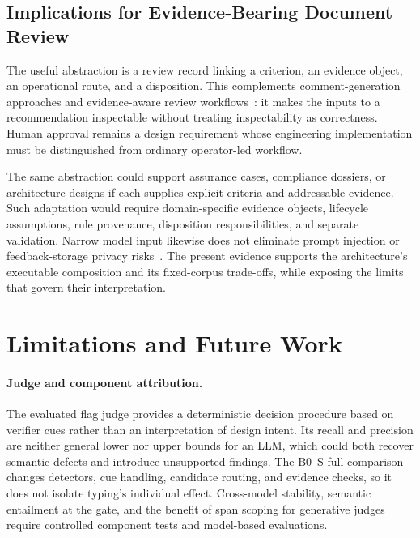 \documentclass[computers,article,submit,moreauthors]{Definitions/mdpi}
\begin{document}
\subsection{Implications for Evidence-Bearing Document Review}

The useful abstraction is a review record linking a criterion, an evidence object, an operational route, and a disposition. This complements comment-generation approaches and evidence-aware review workflows~\cite{alsawalqah2026,pornprasit2024}: it makes the inputs to a recommendation inspectable without treating inspectability as correctness. Human approval remains a design requirement whose engineering implementation must be distinguished from ordinary operator-led workflow.

The same abstraction could support assurance cases, compliance dossiers, or architecture designs if each supplies explicit criteria and addressable evidence. Such adaptation would require domain-specific evidence objects, lifecycle assumptions, rule provenance, disposition responsibilities, and separate validation. Narrow model input likewise does not eliminate prompt injection or feedback-storage privacy risks~\cite{shi2024inject,mempriv2025}. The present evidence supports the architecture's executable composition and its fixed-corpus trade-offs, while exposing the limits that govern their interpretation.

\section{Limitations and Future Work}\label{sec:limitations}

\paragraph{Judge and component attribution.}
The evaluated flag judge provides a deterministic decision procedure based on verifier cues rather than an interpretation of design intent. Its recall and precision are neither general lower nor upper bounds for an LLM, which could both recover semantic defects and introduce unsupported findings. The B0--S-full comparison changes detectors, cue handling, candidate routing, and evidence checks, so it does not isolate typing's individual effect. Cross-model stability, semantic entailment at the gate, and the benefit of span scoping for generative judges require controlled component tests and model-based evaluations.
\end{document}
